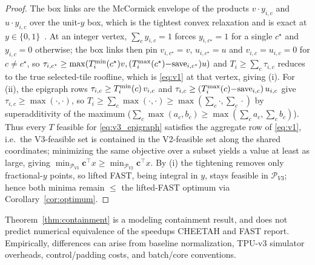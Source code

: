 \begin{proof}
The box links are the McCormick envelope of the products $v\cdot y_{i,c}$ and
$u\cdot y_{i,c}$ over the unit-$y$ box, which is the tightest convex relaxation
and is exact at $y\in\{0,1\}$~\citep{mccormick1976computability}. At an integer
vertex, $\sum_c y_{i,c}=1$ forces $y_{i,c^\star}=1$ for a single $c^\star$ and
$y_{i,c}=0$ otherwise; the box links then pin $v_{i,c^\star}=v$, $u_{i,c^\star}=u$
and $v_{i,c}=u_{i,c}=0$ for $c\ne c^\star$, so
$\tau_{i,c^\star}\ge\max(T^{\min}_i(c^\star)v,(T^{\max}_i(c^\star){-}\mathrm{save}_{i,c^\star})u)$
and $T_i\ge\sum_c\tau_{i,c}$ reduces to the true selected-tile roofline, which is
\eqref{eq:v1} at that vertex, giving (i). For (ii), the epigraph rows
$\tau_{i,c}\ge T^{\min}_i(c)\,v_{i,c}$ and
$\tau_{i,c}\ge(T^{\max}_i(c){-}\mathrm{save}_{i,c})\,u_{i,c}$ give
$\tau_{i,c}\ge\max(\cdot,\cdot)$, so
$T_i\ge\sum_c\max(\cdot,\cdot)\ge\max(\sum_c\cdot,\sum_c\cdot)$ by superadditivity
of the maximum ($\sum_c\max(a_c,b_c)\ge\max(\sum_c a_c,\sum_c b_c)$). Thus every
$T$ feasible for \eqref{eq:v3_epigraph} satisfies the aggregate row of
\eqref{eq:v1}, i.e.\ the V3-feasible set is contained in the V2-feasible set
along the shared coordinates; minimizing the same objective over a subset yields
a value at least as large, giving
$\min_{\mathcal{P}_{V3}}\mathbf{c}^\top x \ge \min_{\mathcal{P}_{V2}}\mathbf{c}^\top x$.
By (i) the tightening removes only fractional-$y$ points, so lifted FAST, being
integral in $y$, stays feasible in $\mathcal{P}_{V3}$; hence both minima remain
$\le$ the lifted-FAST optimum via Corollary~\ref{cor:optimum}.
\end{proof}

Theorem~\ref{thm:containment} is a modeling containment result, and does not predict numerical equivalence of the speedups CHEETAH and FAST report.
Empirically, differences can arise from baseline normalization, TPU-v3 simulator overheads, control/padding costs, and batch/core conventions.

